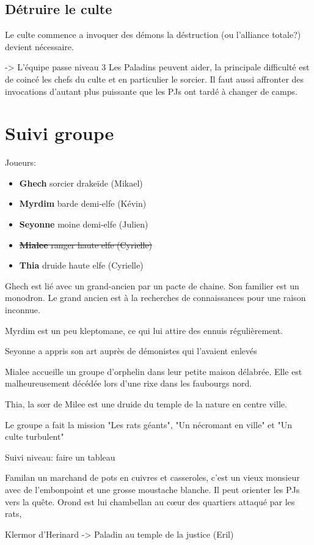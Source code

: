 \subsection{Détruire le culte}

Le culte commence a invoquer des démons la déstruction (ou l'alliance totale?) devient nécessaire.

 -> L'équipe passe niveau 3
Les Paladins peuvent aider, la principale difficulté est de coincé les chefs du culte et en particulier
le sorcier. Il faut aussi affronter des invocations d'autant plus puissante que les PJs ont tardé à changer
de camps. 



\section{Suivi groupe}

Joueurs:
\begin{itemize}
  \item {\bf Ghech} sorcier drakeïde (Mikael)
  \item {\bf Myrdim} barde demi-elfe (Kévin)
  \item {\bf Seyonne} moine demi-elfe (Julien)
  \item \sout{{\bf Mialee} ranger haute elfe (Cyrielle)}
  \item {\bf Thia} druide haute elfe (Cyrielle)
\end{itemize}

Ghech est lié avec un grand-ancien par un pacte de chaine. Son familier est un 
monodron. Le grand ancien est à la recherches de connaissances pour une raison
inconnue.

Myrdim est un peu kleptomane, ce qui lui attire des ennuis régulièrement.

Seyonne a appris son art auprès de démonistes qui l'avaient enlevés

Mialee accueille un groupe d'orphelin dans leur petite maison délabrée. Elle
est malheureusement décédée lors d'une rixe dans les faubourgs nord.

Thia, la s\oe{}r de Milee est une druide du temple de la nature en centre ville.

Le groupe a fait la mission "Les rats géants", "Un nécromant en ville" et "Un culte turbulent"

Suivi niveau: faire un tableau

Familan un marchand de pots en cuivres et 
casseroles, c'est un vieux monsieur avec de l'embonpoint et une grosse 
moustache blanche. Il peut orienter les PJs vers la quête.
Orond est lui chambellan au c\oe{}ur des quartiers attaqué par les rats,

Klermor d'Herinard -> Paladin au temple de la justice (Eril)


